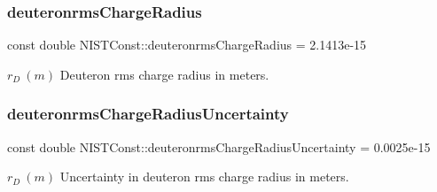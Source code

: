 \subsubsection{\texorpdfstring{deuteronrms\+Charge\+Radius}{deuteronrmsChargeRadius}}
{\footnotesize\ttfamily const double N\+I\+S\+T\+Const\+::deuteronrms\+Charge\+Radius = 2.\+1413e-\/15}

$r_D \ (m)$ Deuteron rms charge radius in meters. \mbox{\label{group___n_i_s_t_const-_deuteron_ga2ab958821d61f10241d90dd6736ef22c}} 
\subsubsection{\texorpdfstring{deuteronrms\+Charge\+Radius\+Uncertainty}{deuteronrmsChargeRadiusUncertainty}}
{\footnotesize\ttfamily const double N\+I\+S\+T\+Const\+::deuteronrms\+Charge\+Radius\+Uncertainty = 0.\+0025e-\/15}

$r_D \ (m)$ Uncertainty in deuteron rms charge radius in meters. 